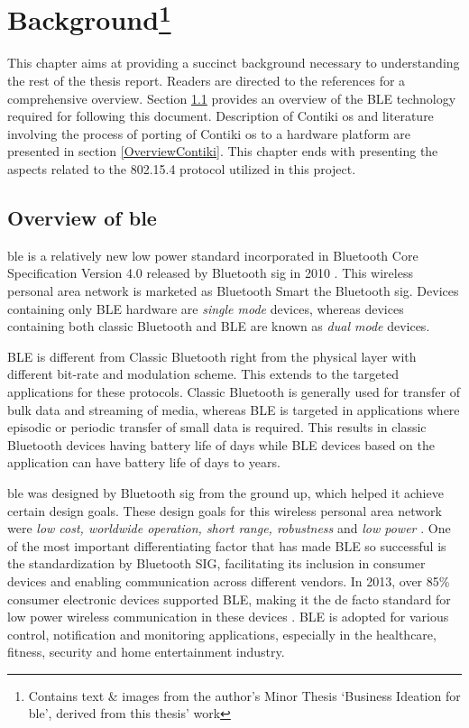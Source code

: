 \chapter[Background]{Background\footnote{Contains text \& images from the author's Minor Thesis `Business Ideation for \gls{ble}', derived from this thesis' work}} \label{2Back}

This chapter aims at providing a succinct background necessary to understanding the rest of the thesis report. Readers are directed to the references for a comprehensive overview. Section \ref{OverviewBLE} provides an overview of the BLE technology required for following this document. Description of Contiki \gls{os} and literature involving the process of porting of Contiki \gls{os} to a hardware platform are presented in section \ref{OverviewContiki}. This chapter ends with presenting the aspects related to the 802.15.4 protocol utilized in this project.


\section{Overview of \texorpdfstring{\acrlong{ble}}{Bluetooth Low Energy}} \label{OverviewBLE}

\acrfull{ble} is a relatively new low power standard incorporated in Bluetooth Core Specification Version 4.0 released by Bluetooth \gls{sig} in 2010 \cite{CoreSpec4.0}. This wireless personal area network is marketed as Bluetooth Smart the Bluetooth \gls{sig}. Devices containing only BLE hardware are \emph{single mode} devices, whereas devices containing both classic Bluetooth and BLE are known as \emph{dual mode} devices. 

BLE is different from Classic Bluetooth right from the physical layer with different bit-rate and modulation scheme. This extends to the targeted applications for these protocols. Classic Bluetooth is generally used for transfer of bulk data and streaming of media, whereas BLE is targeted in applications where episodic or periodic transfer of small data is required. This results in classic Bluetooth devices having battery life of days while BLE devices based on the application can have battery life of days to years.


\gls{ble} was designed by Bluetooth \gls{sig} from the ground up, which helped it achieve certain design goals. These design goals for this wireless personal area network were \emph{low cost, worldwide operation, short range, robustness} and \emph{low power} \cite{Heydon2012}. One of the most important differentiating factor that has made BLE so successful is the standardization by Bluetooth SIG, facilitating its inclusion in consumer devices and enabling communication across different vendors. In 2013, over 85\% consumer electronic devices supported BLE, making it the de facto standard for low power wireless communication in these devices \cite{Martin2014}. BLE is adopted for various control, notification and monitoring applications, especially in the healthcare, fitness, security and home entertainment industry. 

